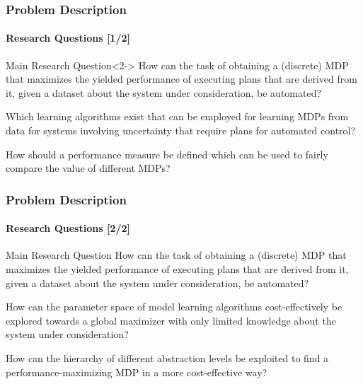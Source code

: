 

\begin{frame}[t]
\frametitle{Problem Description}
\framesubtitle{Research Questions [1/2]}

\begin{block}{Main Research Question}<2->
How can the task of obtaining a (discrete) MDP that maximizes the yielded performance of executing plans that are derived from it, given a dataset about the system under consideration, be automated?
\end{block}

\begin{description}
	\item<3->[RQ1] Which \textcolor{tudOrange}{learning algorithms} exist that can be employed for learning MDPs from data for systems involving uncertainty that require plans for automated control?
	\item<4->[RQ2] How should a  \textcolor{tudOrange}{performance measure} be defined which can be used to fairly compare the value of different MDPs?
\end{description}

\end{frame}

\begin{frame}[t]
	\frametitle{Problem Description}
	\framesubtitle{Research Questions [2/2]}
	
	\begin{block}{Main Research Question}
		How can the task of obtaining a (discrete) MDP that maximizes the yielded performance of executing plans that are derived from it, given a dataset about the system under consideration, be automated?
	\end{block}
	
	\begin{description}
		\item<1->[RQ3] How can the  \textcolor{tudOrange}{parameter space} of model learning algorithms  \textcolor{tudOrange}{cost-effectively be explored} towards a global maximizer with only limited knowledge about the system under consideration?
		\item<2->[RQ4] How can the hierarchy of \textcolor{tudOrange}{different abstraction levels} be exploited to find a performance-maximizing MDP in a more cost-effective way?
	\end{description}
	
\end{frame}

